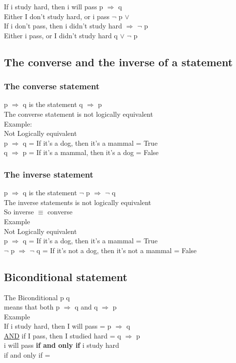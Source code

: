 \documentclass[11pt]{article}
\begin{document}
If i study hard, then i will pass p \(\Rightarrow\) q\\
Either I don't study hard, or i pass \(\neg{}\) p \(\lor\) \q\\
If i don't pass, then i didn't study hard \q \(\Rightarrow\) \(\neg{}\) p\\
Either i pass, or I didn't study hard q \(\lor\) \(\neg{}\) p\\

\subsection{The converse and the inverse of a statement}
\label{sec:org624e289}
\subsubsection{The converse statement}
\label{sec:orga244379}
p \(\Rightarrow\) q is the statement q \(\Rightarrow\) p\\
The converse statement is not logically equivalent\\

Example:\\
Not Logically equivalent\\
p \(\Rightarrow\) q = If it's a dog, then it's a mammal = True\\
q \(\Rightarrow\) p = If it's a mammal, then it's a dog = False\\

\subsubsection{The inverse statement}
\label{sec:orga770bcd}
p \(\Rightarrow\) q is the statement \(\neg{}\) p \(\Rightarrow\) \(\neg{}\) q\\
The inverse statements is not logically equivalent\\

So inverse \(\equiv\) converse\\

Example\\
Not Logically equivalent\\
p \(\Rightarrow\) q = If it's a dog, then it's a mammal = True\\
\(\neg{}\) p \(\Rightarrow\) \(\neg{}\) q = If it's not a dog, then it's not a mammal = False\\

\subsection{Biconditional statement}
\label{sec:org1d80acd}
The Biconditional p \iff q\\
means that both p \(\Rightarrow\) q and q \(\Rightarrow\) p\\

Example\\
If i study hard, then I will pass = p \(\Rightarrow\) q\\
\uline{AND} if I pass, then I studied hard = q \(\Rightarrow\) p\\

i will pass \textbf{if and only if} i study hard\\
if and only if = \iff\\
\end{document}
